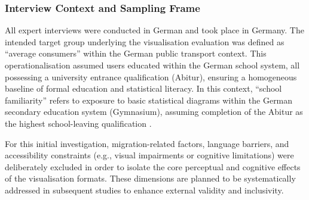 \documentclass[final,journal,a4paper]{IEEEtran}
\begin{document}
\subsubsection{Interview Context and Sampling Frame}
All expert interviews were conducted in German and took place in Germany. The intended target group underlying the visualisation evaluation was defined as ``average consumers'' within the German public transport context. This operationalisation assumed users educated within the German school system, all possessing a university entrance qualification (Abitur), ensuring a homogeneous baseline of formal education and statistical literacy. In this context, ``school familiarity'' refers to exposure to basic statistical diagrams within the German secondary education system (Gymnasium), assuming completion of the Abitur as the highest school-leaving qualification \cite{kaun2006, nrw2028}.

For this initial investigation, migration-related factors, language barriers, and accessibility constraints (e.g., visual impairments or cognitive limitations) were deliberately excluded in order to isolate the core perceptual and cognitive effects of the visualisation formats. These dimensions are planned to be systematically addressed in subsequent studies to enhance external validity and inclusivity.
\end{document}

